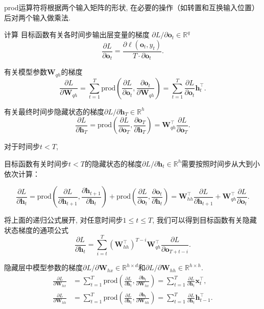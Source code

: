 \documentclass[a4paper]{article}
\theoremstyle{definition}
\numberwithin{equation}{section}
\begin{document}
prod运算符将根据两个输⼊矩阵的形状, 在必要的操作（如转置和互换输⼊位置）后对两个输⼊做乘法. 


计算
目标函数有关各时间步输出层变量的梯度 $\partial L/\partial \boldsymbol{o}_t \in \mathbb{R}^q$
$$\frac{\partial L}{\partial \boldsymbol{o}_t} =  \frac{\partial \ell (\boldsymbol{o}_t,  y_t)}{T \cdot \partial \boldsymbol{o}_t}.$$

有关模型参数$\boldsymbol{W}_{qh}$的梯度
$$
\frac{\partial L}{\partial \boldsymbol{W}_{qh}} 
= \sum_{t=1}^T \text{prod}\left(\frac{\partial L}{\partial \boldsymbol{o}_t},  \frac{\partial \boldsymbol{o}_t}{\partial \boldsymbol{W}_{qh}}\right) 
= \sum_{t=1}^T \frac{\partial L}{\partial \boldsymbol{o}_t} \boldsymbol{h}_t^\top.
$$
 
有关最终时间步隐藏状态的梯度$\partial L/\partial \boldsymbol{h}_T \in \mathbb{R}^h$
$$
\frac{\partial L}{\partial \boldsymbol{h}_T} = \text{prod}\left(\frac{\partial L}{\partial \boldsymbol{o}_T},  \frac{\partial \boldsymbol{o}_T}{\partial \boldsymbol{h}_T} \right) = \boldsymbol{W}_{qh}^\top \frac{\partial L}{\partial \boldsymbol{o}_T}.
$$


对于时间步$t < T$, 

目标函数有关时间步$t < T$的隐藏状态的梯度$\partial L/\partial \boldsymbol{h}_t \in \mathbb{R}^h$需要按照时间步从大到小依次计算：

$$
\frac{\partial L}{\partial \boldsymbol{h}_t}
= \text{prod}\left(\frac{\partial L}{\partial \boldsymbol{h}_{t+1}},  \frac{\partial \boldsymbol{h}_{t+1}}{\partial \boldsymbol{h}_t} \right)
+ \text{prod}\left(\frac{\partial L}{\partial \boldsymbol{o}_t},  \frac{\partial \boldsymbol{o}_t}{\partial \boldsymbol{h}_t} \right)
= \boldsymbol{W}_{hh}^\top \frac{\partial L}{\partial \boldsymbol{h}_{t+1}} + \boldsymbol{W}_{qh}^\top \frac{\partial L}{\partial \boldsymbol{o}_t}.
$$

将上面的递归公式展开, 对任意时间步$1 \leq t \leq T$, 我们可以得到目标函数有关隐藏状态梯度的通项公式
$$
\frac{\partial L}{\partial \boldsymbol{h}_t} 
= \sum_{i=t}^T {\left(\boldsymbol{W}_{hh}^\top\right)}^{T-i} \boldsymbol{W}_{qh}^\top \frac{\partial L}{\partial \boldsymbol{o}_{T+t-i}}.
$$
 
隐藏层中模型参数的梯度$\partial L / \partial \boldsymbol{W}_{hx} \in \mathbb{R}^{h \times d}$和$\partial L / \partial \boldsymbol{W}_{hh} \in \mathbb{R}^{h \times h}$. 
$$
\begin{aligned}
\frac{\partial L}{\partial \boldsymbol{W}_{hx}} 
&= \sum_{t=1}^T \text{prod}\left(\frac{\partial L}{\partial \boldsymbol{h}_t},  \frac{\partial \boldsymbol{h}_t}{\partial \boldsymbol{W}_{hx}}\right) 
= \sum_{t=1}^T \frac{\partial L}{\partial \boldsymbol{h}_t} \boldsymbol{x}_t^\top, \\
\frac{\partial L}{\partial \boldsymbol{W}_{hh}} 
&= \sum_{t=1}^T \text{prod}\left(\frac{\partial L}{\partial \boldsymbol{h}_t},  \frac{\partial \boldsymbol{h}_t}{\partial \boldsymbol{W}_{hh}}\right) 
= \sum_{t=1}^T \frac{\partial L}{\partial \boldsymbol{h}_t} \boldsymbol{h}_{t-1}^\top.
\end{aligned}
$$
\end{document}
